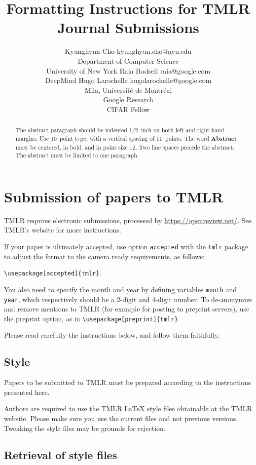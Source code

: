 \documentclass[10pt]{article} %
\title{Formatting Instructions for TMLR \\Journal Submissions}
\author{\name Kyunghyun Cho \email kyunghyun.cho@nyu.edu \\
      \addr Department of Computer Science\\
      University of New York
      \AND
      \name Raia Hadsell \email raia@google.com \\
      \addr DeepMind
      \AND
      \name Hugo Larochelle \email hugolarochelle@google.com\\
      \addr Mila, Universit\'e de Montr\'eal \\
      Google Research\\
      CIFAR Fellow}
\begin{document}
\maketitle

\begin{abstract}
The abstract paragraph should be indented 1/2~inch on both left and
right-hand margins. Use 10~point type, with a vertical spacing of 11~points.
The word \textbf{\large Abstract} must be centered, in bold, and in point size 12. Two
line spaces precede the abstract. The abstract must be limited to one
paragraph.
\end{abstract}

\section{Submission of papers to TMLR}

TMLR requires electronic submissions, processed by
\url{https://openreview.net/}. See TMLR's website for more instructions.

If your paper is ultimately accepted, use option {\tt accepted} with the {\tt tmlr} 
package to adjust the format to the camera ready requirements, as follows:
\begin{center}  
  {\tt {\textbackslash}usepackage[accepted]\{tmlr\}}. 
\end{center}
You also need to specify the month and year
by defining variables {\tt month} and {\tt year}, which respectively
should be a 2-digit and 4-digit number. To de-anonymize and remove mentions
to TMLR (for example for posting to preprint servers), use the preprint option,
as in {\tt {\textbackslash}usepackage[preprint]\{tmlr\}}. 

Please read carefully the instructions below, and follow them
faithfully.

\subsection{Style}

Papers to be submitted to TMLR must be prepared according to the
instructions presented here.

Authors are required to use the TMLR \LaTeX{} style files obtainable at the
TMLR website. Please make sure you use the current files and
not previous versions. Tweaking the style files may be grounds for rejection.

\subsection{Retrieval of style files}
\end{document}
